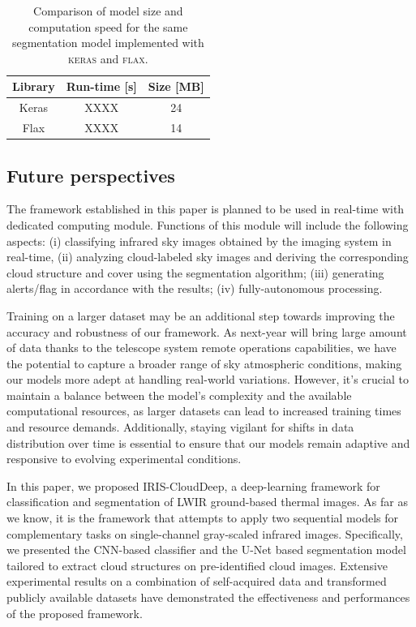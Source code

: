 \documentclass[amt, article]{copernicus}
\begin{document}
\begin{table}[t]
    \begin{center}
        \caption{Comparison of model size and computation speed for the same segmentation model implemented with \textsc{keras} and \textsc{flax}.}
        \begin{tabular}{c c c} 
        \tophline \hline
         Library & Run-time [s] & Size [MB]\\
         \hline
         Keras & XXXX & 24 \\ [1.0ex]
         Flax & XXXX & 14 \\ [1.0ex]
         \hline
        \end{tabular}
        \belowtable{}
        \end{center}
    \end{table}
    

\subsection{Future perspectives}

The framework established in this paper is planned to be used in real-time with dedicated computing module. Functions of this
module will include the following aspects: (i) classifying infrared sky images obtained by the imaging system in real-time, (ii) analyzing cloud-labeled sky images and deriving the corresponding cloud structure and cover using the segmentation algorithm; (iii) generating alerts/flag in accordance with the results; (iv) fully-autonomous processing.

Training on a larger dataset may be an additional step towards improving the accuracy and robustness of our framework. As next-year will bring large amount of data thanks to the telescope system remote operations capabilities, we have the potential to capture a broader range of sky atmospheric conditions, making our models more adept at handling real-world variations. However, it's crucial to maintain a balance between the model's complexity and the available computational resources, as larger datasets can lead to increased training times and resource demands. Additionally, staying vigilant for shifts in data distribution over time is essential to ensure that our models remain adaptive and responsive to evolving experimental conditions.

\conclusions[Conclusion]%
\label{sec:conclusion}

In this paper, we proposed IRIS-CloudDeep, a deep-learning framework for classification and segmentation of LWIR
ground-based thermal images. As far as we know, it is the framework that attempts to apply two sequential models for complementary tasks on single-channel gray-scaled infrared images. Specifically, we presented the CNN-based classifier and the U-Net based segmentation model tailored to extract cloud structures on pre-identified cloud images. Extensive experimental results on a combination of self-acquired data and transformed publicly available datasets have demonstrated
the effectiveness and performances of the proposed framework.
\end{document}
